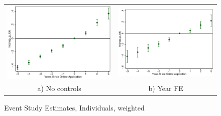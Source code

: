 \documentclass[11pt,letterpaper]{article}
\begin{document}
\begin{figure}\caption{Event Study Estimates, Individuals, weighted}
\begin{tabular}{cc}
\includegraphics[scale=0.57]{tabfig/evstu_snap_p_tot_total_pop_notr_5_3}&\includegraphics[scale=0.57]{tabfig/evstu_snap_p_tot_total_pop_year_5_3}\\
a) No controls&b) Year FE\\

\end{tabular}
\end{figure}
\end{document}
